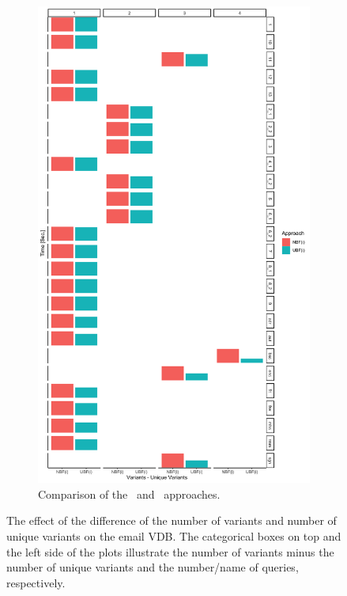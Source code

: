 \begin{figure}[!t]
\begin{subfigure}[t]{0.5\textwidth}
        \includegraphics[scale=0.09]{figs/plots/enron-nbfi-ubfi.png}
        \caption[Comparison of the \nbfi\ and \ubfi\ approaches]{Comparison of the \nbfi\ and \ubfi\ approaches.}
        \label{fig:enron-nbfi-ubfi}
    \end{subfigure}
    \caption[The effect of the difference of the number of variants and number of unique variants on
the email VDB]{The effect of the difference of the number of variants and number of unique 
variants on the email VDB. The categorical boxes on top and the left side of the plots illustrate
the number of variants minus the number of unique variants and the number/name of queries, respectively.}
\label{fig:enron-vars-minus}
\end{figure}

